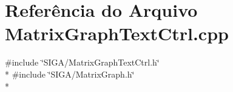 \section{Referência do Arquivo Matrix\+Graph\+Text\+Ctrl.\+cpp}
\label{_matrix_graph_text_ctrl_8cpp}
{\ttfamily \#include \char`\"{}S\+I\+G\+A/\+Matrix\+Graph\+Text\+Ctrl.\+h\char`\"{}}\\*
{\ttfamily \#include \char`\"{}S\+I\+G\+A/\+Matrix\+Graph.\+h\char`\"{}}\\*
